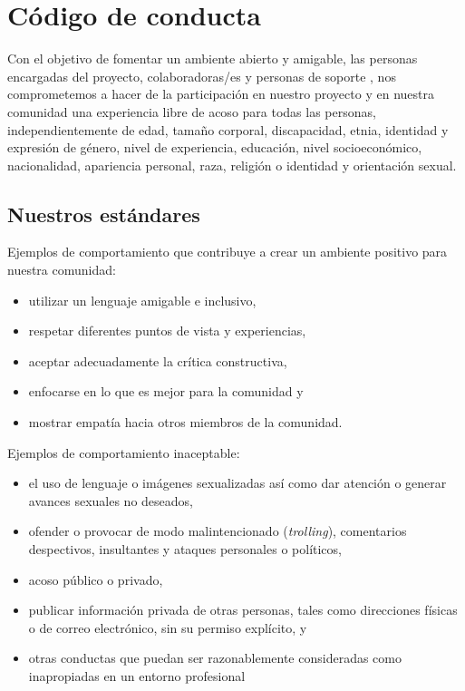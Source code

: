 \chapter{Código de conducta}\label{s:conduct}

Con el objetivo de fomentar un ambiente abierto y amigable, 
las personas encargadas del proyecto, colaboradoras/es y personas de soporte , 
nos comprometemos a hacer de la participación en nuestro proyecto
y en nuestra comunidad una experiencia libre de acoso para todas las personas,
independientemente de edad, tamaño corporal, discapacidad, etnia,
identidad y expresión de género, nivel de experiencia, educación,
nivel socioeconómico, nacionalidad, apariencia personal, raza,
religión o identidad y orientación sexual.

\section*{Nuestros estándares}

Ejemplos de comportamiento que contribuye a crear un ambiente positivo
para nuestra comunidad:

\begin{itemize}
\item
  utilizar un lenguaje amigable e inclusivo,
\item
  respetar diferentes puntos de vista y experiencias,
\item
  aceptar adecuadamente la crítica constructiva,
\item
 enfocarse en lo que es mejor para la comunidad y
\item
 mostrar empatía hacia otros miembros de la comunidad.
\end{itemize}

\noindent
Ejemplos de comportamiento inaceptable:

\begin{itemize}
\item
  el uso de lenguaje o imágenes sexualizadas así como  
  dar atención o generar avances sexuales no deseados,
\item
  ofender o provocar de modo malintencionado (\emph{trolling}), comentarios despectivos, insultantes y ataques personales o políticos,
\item
 acoso  público o privado,
\item
  publicar información privada de otras personas, tales como direcciones
  físicas o de correo electrónico, sin su permiso explícito, y
\item
  otras conductas que puedan ser razonablemente consideradas
  como inapropiadas en un entorno profesional
\end{itemize}

